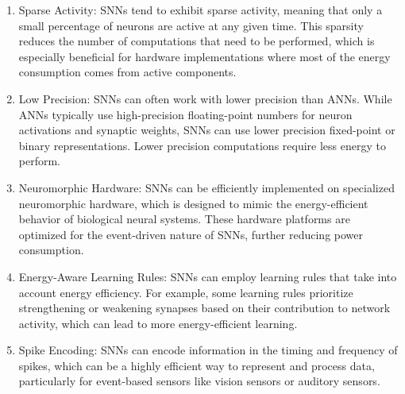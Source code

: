 \begin{frame}[allowframebreaks]
\begin{enumerate}
		\item Sparse Activity: SNNs tend to exhibit sparse activity, meaning that only a small percentage of neurons are active at any given time. This sparsity reduces the number of computations that need to be performed, which is especially beneficial for hardware implementations where most of the energy consumption comes from active components.
	
		\item Low Precision: SNNs can often work with lower precision than ANNs. While ANNs typically use high-precision floating-point numbers for neuron activations and synaptic weights, SNNs can use lower precision fixed-point or binary representations. Lower precision computations require less energy to perform.
	
		\item Neuromorphic Hardware: SNNs can be efficiently implemented on specialized neuromorphic hardware, which is designed to mimic the energy-efficient behavior of biological neural systems. These hardware platforms are optimized for the event-driven nature of SNNs, further reducing power consumption.
	
		\item Energy-Aware Learning Rules: SNNs can employ learning rules that take into account energy efficiency. For example, some learning rules prioritize strengthening or weakening synapses based on their contribution to network activity, which can lead to more energy-efficient learning.
	
		\item Spike Encoding: SNNs can encode information in the timing and frequency of spikes, which can be a highly efficient way to represent and process data, particularly for event-based sensors like vision sensors or auditory sensors.
	\end{enumerate}

	
		 
\end{frame}